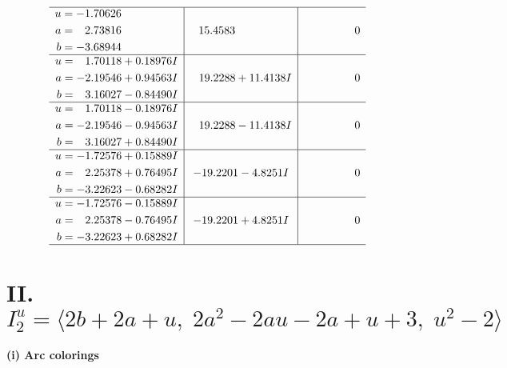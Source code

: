 \documentclass[1p]{elsarticle_modified}
\theoremstyle{definition}
\begin{document}
$$\begin{array}{c|c|c}
 \hline 
\begin{aligned}
u &= -1.70626\phantom{ +0.000000I} \\
a &= \phantom{-}2.73816\phantom{ +0.000000I} \\
b &= -3.68944\phantom{ +0.000000I}\end{aligned}
 & \phantom{-}15.4583\phantom{ +0.000000I} & \phantom{-0.000000 } 0 \\ \hline\begin{aligned}
u &= \phantom{-}1.70118 + 0.18976 I \\
a &= -2.19546 + 0.94563 I \\
b &= \phantom{-}3.16027 - 0.84490 I\end{aligned}
 & \phantom{-}19.2288 + 11.4138 I & \phantom{-0.000000 } 0 \\ \hline\begin{aligned}
u &= \phantom{-}1.70118 - 0.18976 I \\
a &= -2.19546 - 0.94563 I \\
b &= \phantom{-}3.16027 + 0.84490 I\end{aligned}
 & \phantom{-}19.2288 - 11.4138 I & \phantom{-0.000000 } 0 \\ \hline\begin{aligned}
u &= -1.72576 + 0.15889 I \\
a &= \phantom{-}2.25378 + 0.76495 I \\
b &= -3.22623 - 0.68282 I\end{aligned}
 & -19.2201 - 4.8251 I & \phantom{-0.000000 } 0 \\ \hline\begin{aligned}
u &= -1.72576 - 0.15889 I \\
a &= \phantom{-}2.25378 - 0.76495 I \\
b &= -3.22623 + 0.68282 I\end{aligned}
 & -19.2201 + 4.8251 I & \phantom{-0.000000 } 0\\
 \hline 
 \end{array}$$\newpage\newpage\renewcommand{\arraystretch}{1}
\centering \section*{II. $I^u_{2}= \langle 2 b+2 a+u,\;2 a^2-2 a u-2 a+u+3,\;u^2-2 \rangle$}
\flushleft \textbf{(i) Arc colorings}\\
\end{document}
